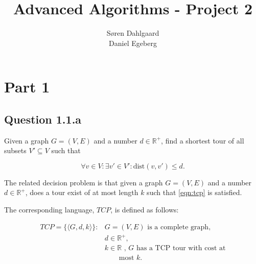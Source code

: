 \documentclass{sig-alternate}
\begin{document}
\title{Advanced Algorithms - Project 2}


\author{
\alignauthor
Søren Dahlgaard\\
\alignauthor
Daniel Egeberg\\
}

\maketitle

\section*{Part 1}
\subsection*{Question 1.1.a}

Given a graph $G=(V,E)$ and a number $d \in \mathbb{R}^+$, find a shortest
tour of all subsets $V'\subseteq V$ such that

\begin{equation}
    \label{eqn:tcp}
    \forall v \in V : \exists v' \in V' : \text{dist}(v,v') \leq d.
\end{equation}

The related decision problem is that given a graph $G=(V,E)$ and a number $d
\in \mathbb{R}^+$, does a tour exist of at most length $k$ such that
\autoref{eqn:tcp} is satisfied.

The corresponding language, $TCP$, is defined as follows:

\begin{align*}
    TCP = \{\langle G, d, k \rangle\} :& G = (V,E) \text{ is a complete graph,} \\
        & d \in \mathbb{R}^+, \\
        & k \in \mathbb{R} \text{ , $G$ has a TCP tour with cost at} \\
        & \qquad \text{most $k$.}
\end{align*}
\end{document}
